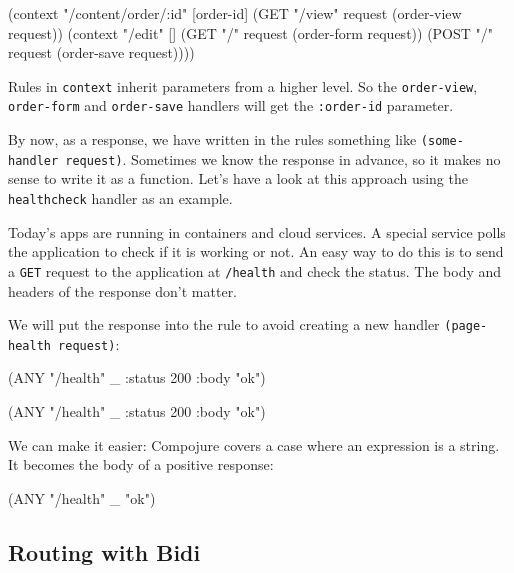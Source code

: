 \else

\begin{clojure}
(context "/content/order/:id" [order-id]
  (GET  "/view" request (order-view request))
  (context "/edit" []
    (GET  "/" request (order-form request))
    (POST "/" request (order-save request))))
\end{clojure}

\fi

Rules in \verb|context| inherit parameters from a higher level. So the \verb|order-view|, \verb|order-form| and \verb|order-save| handlers will get the \verb|:order-id| parameter.

By now, as a response, we have written in the rules something like \verb|(some-handler request)|. Sometimes we know the response in advance, so it makes no sense to write it as a function. Let's have a look at this approach using the \verb|healthcheck| handler as an example.

Today's apps are running in containers and cloud services.  A special service polls the application to check if it is working or not. An easy way to do this is to send a \verb|GET| request to the application at \verb|/health| and check the status. The body and headers of the response don't matter.

We will put the response into the rule to avoid creating a new handler \verb|(page-health request)|:


\ifx\DEVICETYPE\MOBILE

\begin{clojure}
(ANY "/health" _
     {:status 200 :body "ok"})
\end{clojure}

\else

\begin{clojure}
(ANY "/health" _ {:status 200 :body "ok"})
\end{clojure}

\fi

We can make it easier: Compojure covers a case where an expression is a string. It becomes the body of a positive response:

\begin{clojure}
(ANY "/health" _ "ok")
\end{clojure}

\subsection{Routing with Bidi}

